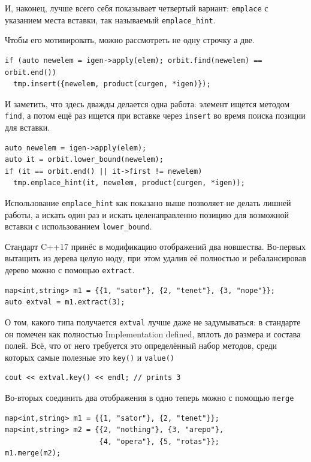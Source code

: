 \documentclass[a4paper,12pt,oneside]{book}
\begin{document}
И, наконец, лучше всего себя показывает четвертый вариант: \lstinline!emplace! с указанием места вставки, так называемый \lstinline!emplace_hint!.

Чтобы его мотивировать, можно рассмотреть не одну строчку а две.

\begin{lstlisting}
if (auto newelem = igen->apply(elem); orbit.find(newelem) == orbit.end())
  tmp.insert({newelem, product(curgen, *igen)});
\end{lstlisting}

И заметить, что здесь дважды делается одна работа: элемент ищется методом \lstinline!find!, а потом ещё раз ищется при вставке через \lstinline!insert! во время поиска позиции для вставки.

\begin{lstlisting}
auto newelem = igen->apply(elem);
auto it = orbit.lower_bound(newelem);
if (it == orbit.end() || it->first != newelem)
  tmp.emplace_hint(it, newelem, product(curgen, *igen));
\end{lstlisting}

Использование \lstinline!emplace_hint! как показано выше позволяет не делать лишней работы, а искать один раз и искать целенаправленно позицию для возможной вставки с использованием \lstinline!lower_bound!.

Стандарт C++17 принёс в модификацию отображений два новшества. Во-первых вытащить из дерева целую ноду, при этом удалив её полностью и ребалансировав дерево можно с помощью \lstinline!extract!.

\begin{lstlisting}
map<int,string> m1 = {{1, "sator"}, {2, "tenet"}, {3, "nope"}};
auto extval = m1.extract(3);
\end{lstlisting}

О том, какого типа получается \lstinline!extval! лучше даже не задумываться: в стандарте он помечен как полностью Implementation defined, вплоть до размера и состава полей. Всё, что от него требуется это определённый набор методов, среди которых самые полезные это \lstinline!key()! и \lstinline!value()!

\begin{lstlisting}
cout << extval.key() << endl; // prints 3
\end{lstlisting}

Во-вторых соединить два отображения в одно теперь можно с помощью \lstinline!merge!

\begin{lstlisting}
map<int,string> m1 = {{1, "sator"}, {2, "tenet"}};
map<int,string> m2 = {{2, "nothing"}, {3, "arepo"},
                      {4, "opera"}, {5, "rotas"}};
m1.merge(m2);
\end{lstlisting}
\end{document}
